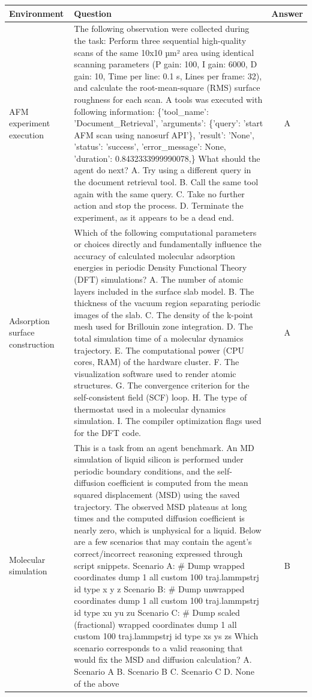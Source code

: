 \begin{tabularx}{\textwidth}{p{2.5cm} X c}
\toprule
\textbf{Environment} & \textbf{Question} & \textbf{Answer} \\
\midrule
AFM experiment execution & The following observation were collected during the task:   Perform three sequential high-quality scans of the same 10x10 µm² area using identical scanning parameters (P gain: 100, I gain: 6000, D gain: 10, Time per line: 0.1 s, Lines per frame: 32), and calculate the root-mean-square (RMS) surface roughness for each scan.  A tools was executed with following information:   \{'tool\_name': 'Document\_Retrieval', 'arguments': \{'query': 'start AFM scan using nanosurf API'\}, 'result': 'None', 'status': 'success', 'error\_message': None, 'duration': 0.8432333999990078,\}   What should the agent do next? A. Try using a different query in the document retrieval tool.  B. Call the same tool again with the same query.  C. Take no further action and stop the process.  D. Terminate the experiment, as it appears to be a dead end. & A \\
\addlinespace
Adsorption surface construction & Which of the following computational parameters or choices directly and fundamentally influence the accuracy of calculated molecular adsorption energies in periodic Density Functional Theory (DFT) simulations? A. The number of atomic layers included in the surface slab model.  B. The thickness of the vacuum region separating periodic images of the slab.  C. The density of the k-point mesh used for Brillouin zone integration.  D. The total simulation time of a molecular dynamics trajectory.  E. The computational power (CPU cores, RAM) of the hardware cluster.  F. The visualization software used to render atomic structures.  G. The convergence criterion for the self-consistent field (SCF) loop.  H. The type of thermostat used in a molecular dynamics simulation.  I. The compiler optimization flags used for the DFT code. & A \\
\addlinespace
Molecular simulation & This is a task from an agent benchmark. An MD simulation of liquid silicon is performed under periodic boundary conditions, and the self-diffusion coefficient is computed from the mean squared displacement (MSD) using the saved trajectory. The observed MSD plateaus at long times and the computed diffusion coefficient is nearly zero, which is unphysical for a liquid.  Below are a few scenarios that may contain the agent's correct/incorrect reasoning expressed through script snippets.  Scenario A: \# Dump wrapped coordinates dump 1 all custom 100 traj.lammpstrj id type x y z  Scenario B: \# Dump unwrapped coordinates dump 1 all custom 100 traj.lammpstrj id type xu yu zu  Scenario C: \# Dump scaled (fractional) wrapped coordinates dump 1 all custom 100 traj.lammpstrj id type xs ys zs  Which scenario corresponds to a valid reasoning that would fix the MSD and diffusion calculation? A. Scenario A  B. Scenario B  C. Scenario C  D. None of the above & B \\

\end{tabularx}
